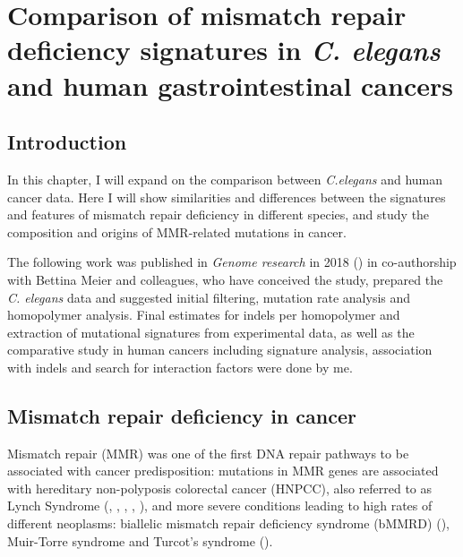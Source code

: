 

\pagestyle{empty}

\chapter{Comparison of mismatch repair deficiency signatures in \textit{C. elegans} and human gastrointestinal cancers}

\section{Introduction}

In this chapter, I will expand on the comparison between \textit{C.elegans} 
and human cancer data. Here I will show similarities
and differences between the signatures and features of mismatch repair deficiency in different species, 
and study the composition and origins of MMR-related mutations in cancer.


The following work was published in \textit{Genome research} in 2018 (\cite{Meier2018-qz}) in co-authorship 
with Bettina Meier and colleagues, who have conceived the study, prepared the \textit{C. elegans} data 
and suggested initial filtering, mutation rate analysis and homopolymer analysis. Final estimates for indels 
per homopolymer and extraction of mutational signatures from experimental data, as well as the comparative study 
in human cancers including signature analysis, association with indels and search for interaction factors 
were done by me.




\section{Mismatch repair deficiency in cancer}


Mismatch repair (MMR) was one of the first DNA repair pathways to be associated with 
cancer predisposition: mutations in MMR genes are associated with hereditary non-polyposis 
colorectal cancer (HNPCC), also referred to as Lynch Syndrome (\cite{Fishel1994-pp}, 
\cite{Bronner1994-nd}, \cite{Nicolaides1994-ro}, \cite{Papadopoulos1994-zk}, \cite{Miyaki1997-ae}), 
and more severe conditions leading to high rates of different neoplasms: 
biallelic mismatch repair deficiency syndrome (bMMRD) (\cite{Durno2015-lx}), Muir-Torre syndrome 
and Turcot's syndrome (\cite{Lawes2003-zd}).

